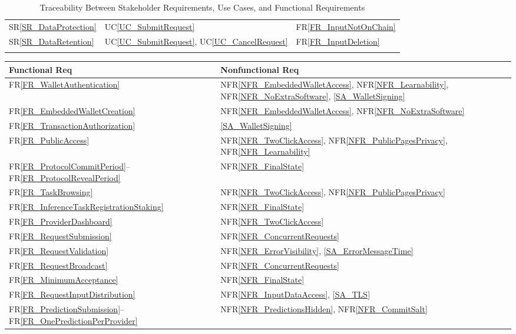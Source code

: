 \documentclass[12pt]{article}
\newcommand{\srref}[1]{SR\ref{#1}}
\newcommand{\ucref}[1]{UC\ref{#1}}
\newcommand{\rref}[1]{FR\ref{#1}}
\newcommand{\nfrref}[1]{NFR\ref{#1}}
\begin{document}
\begin{longtable}{p{} p{} p{}}
\srref{SR_DataProtection} & \ucref{UC_SubmitRequest}
  & \rref{FR_InputNotOnChain} \\[0.5em]

\srref{SR_DataRetention} & \ucref{UC_SubmitRequest}, \ucref{UC_CancelRequest}
  & \rref{FR_InputDeletion} \\
\bottomrule

\caption{Traceability Between Stakeholder Requirements, Use Cases, and
Functional Requirements} \label{tab:SR2UC2FRtm}
\end{longtable}

\begin{longtable}{p{} p{}}

\toprule
Functional Req & Nonfunctional Req \\
\midrule
\rref{FR_WalletAuthentication} & \nfrref{NFR_EmbeddedWalletAccess}, \nfrref{NFR_Learnability}, \nfrref{NFR_NoExtraSoftware}, \ref{SA_WalletSigning} \\
\rref{FR_EmbeddedWalletCreation} & \nfrref{NFR_EmbeddedWalletAccess}, \nfrref{NFR_NoExtraSoftware} \\
\rref{FR_TransactionAuthorization} & \ref{SA_WalletSigning} \\
\rref{FR_PublicAccess} & \nfrref{NFR_TwoClickAccess}, \nfrref{NFR_PublicPagesPrivacy}, \nfrref{NFR_Learnability} \\
\rref{FR_ProtocolCommitPeriod}--\rref{FR_ProtocolRevealPeriod} & \nfrref{NFR_FinalState} \\
\rref{FR_TaskBrowsing} & \nfrref{NFR_TwoClickAccess}, \nfrref{NFR_PublicPagesPrivacy} \\
\rref{FR_InferenceTaskRegistrationStaking} & \nfrref{NFR_FinalState} \\
\rref{FR_ProviderDashboard} & \nfrref{NFR_TwoClickAccess} \\
\rref{FR_RequestSubmission} & \nfrref{NFR_ConcurrentRequests} \\
\rref{FR_RequestValidation} & \nfrref{NFR_ErrorVisibility}, \ref{SA_ErrorMessageTime} \\
\rref{FR_RequestBroadcast} & \nfrref{NFR_ConcurrentRequests} \\
\rref{FR_MinimumAcceptance} & \nfrref{NFR_FinalState} \\
\rref{FR_RequestInputDistribution} & \nfrref{NFR_InputDataAccess}, \ref{SA_TLS} \\
\rref{FR_PredictionSubmission}--\rref{FR_OnePredictionPerProvider} & \nfrref{NFR_PredictionsHidden}, \nfrref{NFR_CommitSalt} \\

\end{longtable}
\end{document}
